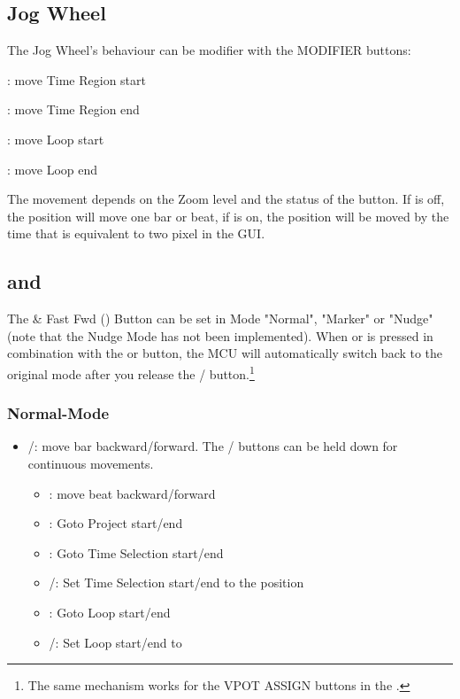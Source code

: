 \subsection{Jog Wheel}
The Jog Wheel's behaviour can be modifier with the MODIFIER buttons:
\begin{compactitem}
\item \shift: move Time Region start
\item \option: move Time Region end
\item \control: move Loop start
\item \alt: move Loop end
\end{compactitem}

The movement depends on the Zoom level and the status of the \scrub
button. If \scrub is off, the position will move one bar or beat, if
\scrub is on, the position will be moved by the time that is equivalent to two
pixel in the \reaper GUI.

\subsection{\rewind and \forward}

The \rewind \& Fast Fwd (\forward) Button can be set in Mode "Normal", "Marker" or
"Nudge" (note that the Nudge Mode has not been implemented). When \rewind or \forward is
pressed in combination with the \marker or \nudge button, the MCU will
automatically switch back to the original mode after you release the \marker/\nudge
button.\footnote{The same mechanism works for the VPOT ASSIGN buttons in the
\hyperref[csmodes]{\fsm}.}

\subsubsection{Normal-Mode}
\begin{itemize}
\item \rewind/\forward: move  bar backward/forward. The \rewind/\forward
buttons can be held down for continuous movements.
\bemod
\begin{itemize}
  \item \shift: move  beat backward/forward 
  \item \control: Goto Project start/end
  \item \option: Goto Time Selection start/end
  \item \shift/\option: Set Time Selection start/end to the \ec position 
  \item \alt: Goto Loop start/end
  \item \shift/\alt: Set Loop start/end to \ec 
\end{itemize}
\end{itemize}

